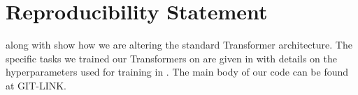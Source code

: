 \section{Reproducibility Statement}

 along with  show how we are altering the standard Transformer architecture.
The specific tasks we trained our Transformers on are given in  with details on the hyperparameters used for training in .
The main body of our code can be found at GIT-LINK.

